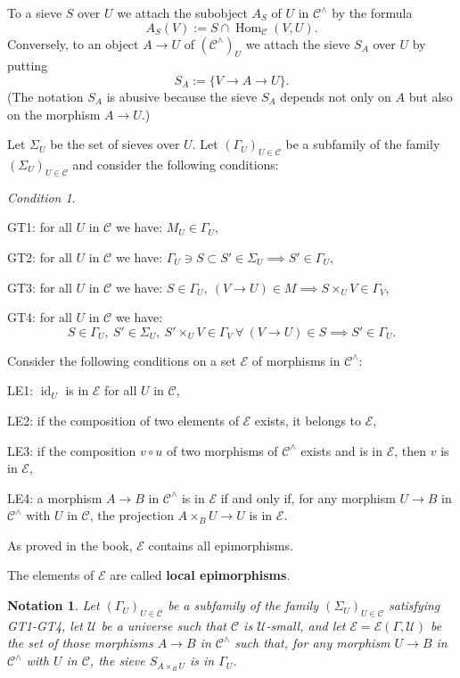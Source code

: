 \documentclass[12pt]{article}%
\newtheorem{nota}[thm]{Notation}
\theoremstyle{remark}
\newtheorem{cond}[thm]{Condition}
\theoremstyle{definition}
\newcommand{\nn}{\noindent}
\newcommand{\cc}{\mathcal}
\newcommand{\C}{\mathcal C}
\newcommand{\U}{\mathcal U}
\DeclareMathOperator{\id}{id}
\DeclareMathOperator{\Hom}{Hom}%
\begin{document}
To a sieve $S$ over $U$ we attach the subobject $A_S$ of $U$ in $\C^\wedge$ by the formula
$$
A_S(V):=S\cap\Hom_\C(V,U).
$$ 
Conversely, to an object $A\to U$ of $(\C^\wedge)_U$ we attach the sieve $S_A$ over $U$ by putting 
$$
S_A:=\{V\to A\to U\}.
$$ 
(The notation $S_A$ is abusive because the sieve $S_A$ depends not only on $A$ but also on the morphism $A\to U$.)

Let $\Sigma_U$ be the set of sieves over $U$. Let $(\Gamma_U)_{U\in\C}$ be a subfamily of the family $(\Sigma_U)_{U\in\C}$ and consider the following conditions:

\begin{cond}\label{gt}
$\ $

\nn GT1: for all $U$ in $\C$ we have: $M_U\in\Gamma_U$,

\nn GT2: for all $U$ in $\C$ we have: $\Gamma_U\ni S\subset S'\in\Sigma_U\implies S'\in\Gamma_U$,

\nn GT3: for all $U$ in $\C$ we have: $S\in\Gamma_U,\ (V\to U)\in M\implies S\times_UV\in\Gamma_V$,

\nn GT4: for all $U$ in $\C$ we have: 
$$
S\in\Gamma_U,\ S'\in\Sigma_U,\ S'\times_UV\in\Gamma_V\ \forall\ (V\to U)\in S\implies S'\in\Gamma_U.
$$
\end{cond}

Consider the following conditions on a set $\cc E$ of morphisms in $\C^\wedge$:

\nn LE1: $\id_U$ is in $\cc E$ for all $U$ in $\C$,

\nn LE2: if the composition of two elements of $\cc E$ exists, it belongs to $\cc E$,

\nn LE3: if the composition $v\circ u$ of two morphisms of $\C^\wedge$ exists and is in $\cc E$, then $v$ is in $\cc E$,

\nn LE4: a morphism $A\to B$ in $\C^\wedge$ is in $\cc E$ if and only if, for any morphism $U\to B$ in $\C^\wedge$ with $U$ in $\C$, the projection $A\times_BU\to U$ is in $\cc E$.

As proved in the book, $\cc E$ contains all epimorphisms. 

The elements of $\cc E$ are called \textbf{local epimorphisms}.

\begin{nota}\label{cce}
Let $(\Gamma_U)_{U\in\C}$ be a subfamily of the family $(\Sigma_U)_{U\in\C}$ satisfying GT1\--GT4, let $\U$ be a universe such that $\C$ is $\U$-small, and let $\cc E=\cc E(\Gamma,\U)$ be the set of those morphisms $A\to B$ in $\C^\wedge$ such that, for any morphism $U\to B$ in $\C^\wedge$ with $U$ in $\C$, the sieve $S_{A\times_BU}$ is in $\Gamma_U$. 
\end{nota}
\end{document}

